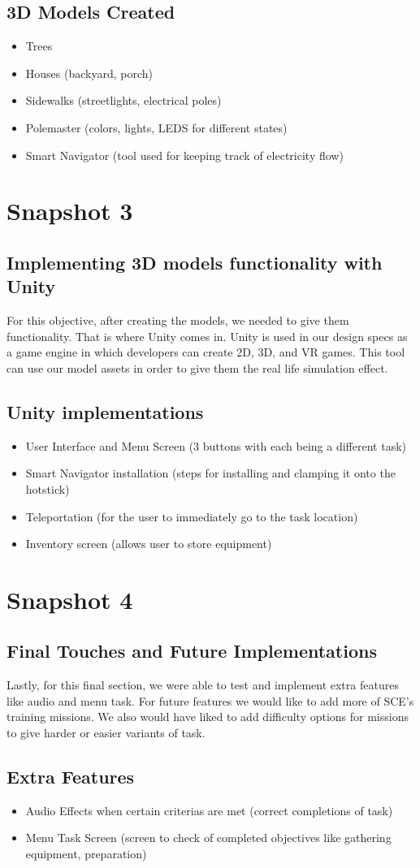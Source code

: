 \documentclass[12pt]{article}
\begin{document}
\subsection{3D Models Created}
\begin{itemize}
    \item Trees
    \item Houses (backyard, porch)
    \item Sidewalks (streetlights, electrical poles)
    \item Polemaster (colors, lights, LEDS for different states)
    \item Smart Navigator (tool used for keeping track of electricity flow)
\end{itemize}

\section{Snapshot 3}
\subsection{Implementing 3D models functionality with Unity}
For this objective, after creating the models, we needed to give them functionality. That is where Unity comes in. 
Unity is used in our design specs as a game engine in which developers can create 2D, 3D, and VR games. This tool 
can use our model assets in order to give them the real life simulation effect. 
\subsection{Unity implementations}
\begin{itemize}
    \item User Interface and Menu Screen (3 buttons with each being a different task)
    \item Smart Navigator installation (steps for installing and clamping it onto the hotstick)
    \item Teleportation (for the user to immediately go to the task location)
    \item Inventory screen (allows user to store equipment)
\end{itemize}

\section{Snapshot 4}
\subsection{Final Touches and Future Implementations}
Lastly, for this final section, we were able to test and implement extra features like audio and menu task. 
For future features we would like to add more of SCE's training missions.
We also would have liked to add difficulty options for missions to give harder or easier variants of task.
\subsection{Extra Features}
\begin{itemize}
    \item Audio Effects when certain criterias are met (correct completions of task)
    \item Menu Task Screen (screen to check of completed objectives like gathering equipment, preparation)
\end{itemize}
\end{document}
